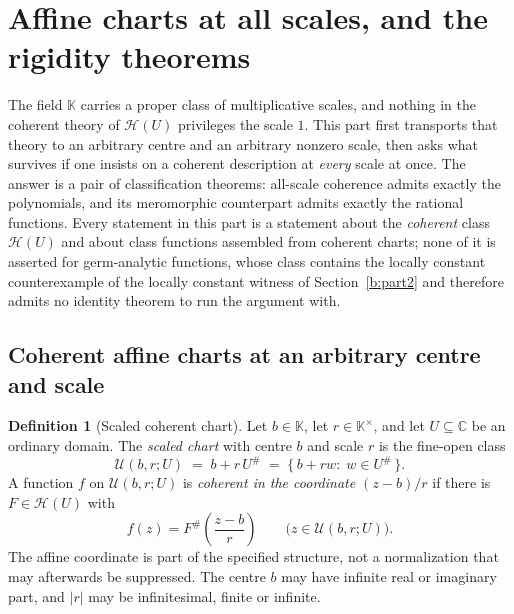 \documentclass[11pt,a4paper]{article}
\numberwithin{equation}{section}
\theoremstyle{definition}
\newtheorem{definition}[theorem]{Definition}
\theoremstyle{remark}
\theoremstyle{plain}
\newcommand{\K}{\mathbb K}
\newcommand{\CC}{\mathbb C}
\newcommand{\halo}[1]{#1^{\#}}
\newcommand{\ev}[1]{#1^{\#}}
\newcommand{\Hc}{\mathcal H}
\newcommand{\abs}[1]{\lvert #1\rvert}
\begin{document}


\section{Affine charts at all scales, and the rigidity theorems}
\label{f:sec-allscale}

The field $\K$ carries a proper class of multiplicative scales, and
nothing in the coherent theory of $\Hc(U)$ privileges the scale $1$.
This part first transports that theory to an arbitrary centre and an
arbitrary nonzero scale, then asks what survives if one insists on a
coherent description at \emph{every} scale at once.  The answer is a
pair of classification theorems: all-scale coherence admits exactly the
polynomials, and its meromorphic counterpart admits exactly the rational
functions.  Every statement in this part is a statement about the
\emph{coherent} class $\Hc(U)$ and about class functions assembled from
coherent charts; none of it is asserted for germ-analytic functions,
whose class contains the locally constant counterexample of
the locally constant witness of Section~\ref{b:part2} and therefore admits no identity theorem to
run the argument with.

\subsection{Coherent affine charts at an arbitrary centre and scale}
\label{f:sub-charts}

\begin{definition}[Scaled coherent chart]\label{f:def-chart}
Let $b\in\K$, let $r\in\K^{\times}$, and let $U\subseteq\CC$ be an
ordinary domain.  The \emph{scaled chart} with centre $b$ and scale $r$
is the fine-open class
\[
 \mathcal U(b,r;U)\;=\;b+r\,\halo U\;=\;\{\,b+rw:\;w\in\halo U\,\}.
\]
A function $f$ on $\mathcal U(b,r;U)$ is \emph{coherent in the
coordinate $(z-b)/r$} if there is $F\in\Hc(U)$ with
\[
 f(z)=\ev F\!\left(\frac{z-b}{r}\right)
 \qquad\bigl(z\in\mathcal U(b,r;U)\bigr).
\]
The affine coordinate is part of the specified structure, not a
normalization that may afterwards be suppressed.  The centre $b$ may
have infinite real or imaginary part, and $\abs r$ may be infinitesimal,
finite or infinite.
\end{definition}
\end{document}
